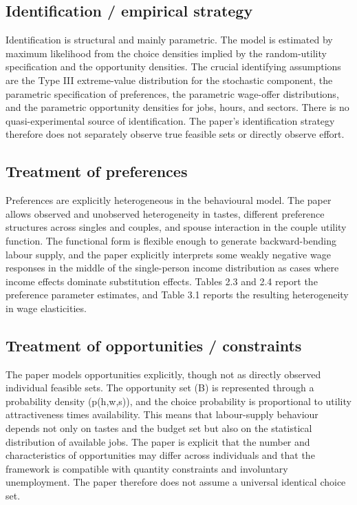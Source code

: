 \documentclass[11pt,a4paper]{article}
\begin{document}
\subsection*{Identification / empirical strategy}
Identification is structural and mainly parametric. The model is estimated by maximum likelihood from the choice densities implied by the random-utility specification and the opportunity densities. The crucial identifying assumptions are the Type III extreme-value distribution for the stochastic component, the parametric specification of preferences, the parametric wage-offer distributions, and the parametric opportunity densities for jobs, hours, and sectors. There is no quasi-experimental source of identification. The paper’s identification strategy therefore does not separately observe true feasible sets or directly observe effort.

\subsection*{Treatment of preferences}
Preferences are explicitly heterogeneous in the behavioural model. The paper allows observed and unobserved heterogeneity in tastes, different preference structures across singles and couples, and spouse interaction in the couple utility function. The functional form is flexible enough to generate backward-bending labour supply, and the paper explicitly interprets some weakly negative wage responses in the middle of the single-person income distribution as cases where income effects dominate substitution effects. Tables 2.3 and 2.4 report the preference parameter estimates, and Table 3.1 reports the resulting heterogeneity in wage elasticities.

\subsection*{Treatment of opportunities / constraints}
The paper models opportunities explicitly, though not as directly observed individual feasible sets. The opportunity set (B) is represented through a probability density (p(h,w,s)), and the choice probability is proportional to utility attractiveness times availability. This means that labour-supply behaviour depends not only on tastes and the budget set but also on the statistical distribution of available jobs. The paper is explicit that the number and characteristics of opportunities may differ across individuals and that the framework is compatible with quantity constraints and involuntary unemployment. The paper therefore does not assume a universal identical choice set.
\end{document}
